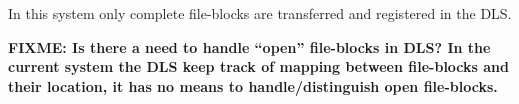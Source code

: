 \documentclass[pdftex]{cmspaper}
\begin{document}
In this system only complete file-blocks are transferred and 
registered in the DLS. 

{\bf FIXME: Is there a need to handle ``open'' file-blocks in DLS? In the current system the DLS keep track of mapping between file-blocks and their location, it has no means to handle/distinguish open file-blocks.}



%
%
%
% 
%
%
% 
% 
%
%
%
%
%
%
\end{document}
